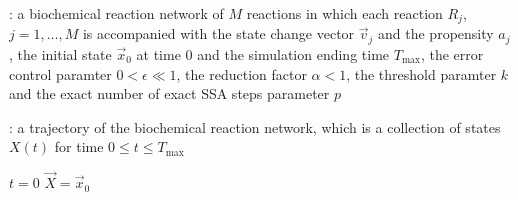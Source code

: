 \begin{algorithm}[H]
\DontPrintSemicolon
{}

\caption{\protect\TitleFunction{}}
\label{algo:binomial-tau-leaping}

\Input: a biochemical reaction network of $M$ reactions in which each reaction $R_j$, $j=1, \dots, M$ is accompanied with the state change vector $\vec{v}_j$ and the propensity $a_j$, the initial state $\vec{x}_0$ at time $0$ and the simulation ending time $T_{\max}$, the error control paramter $0<\epsilon\ll 1$, the reduction factor $\alpha < 1$, the threshold paramter $k$ and the exact number of exact SSA steps parameter $p$\;

\Output: a trajectory of the biochemical reaction network, which is a collection of states $X(t)$ for time $0\le t\le T_{\max}$\;

$t = 0$\;
$\vec{X} = \vec{x}_0$\;


\end{algorithm}
